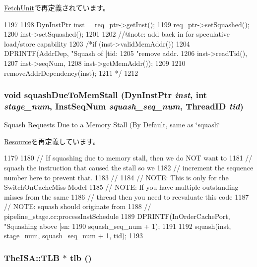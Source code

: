 \hyperlink{classFetchUnit_ac2831520eb121be08811b040992f416b}{FetchUnit}で再定義されています。


\begin{DoxyCode}
1197 {
1198     DynInstPtr inst =  req_ptr->getInst();
1199     req_ptr->setSquashed();
1200     inst->setSquashed();
1201 
1202     //@note: add back in for speculative load/store capability
1203     /*if (inst->validMemAddr()) {
1204         DPRINTF(AddrDep, "Squash of [tid:%
1205                 "remove addr. %
1206                 inst->readTid(),
1207                 inst->seqNum,
1208                 inst->getMemAddr());
1209 
1210         removeAddrDependency(inst);
1211     }*/
1212 }
\end{DoxyCode}
\hypertarget{classCacheUnit_ae2d6fba25ece343caad6eb029a4a3b5b}{
\subsubsection[{squashDueToMemStall}]{\setlength{\rightskip}{0pt plus 5cm}void squashDueToMemStall ({\bf DynInstPtr} {\em inst}, \/  int {\em stage\_\-num}, \/  {\bf InstSeqNum} {\em squash\_\-seq\_\-num}, \/  {\bf ThreadID} {\em tid})}}
\label{classCacheUnit_ae2d6fba25ece343caad6eb029a4a3b5b}
Squash Requests Due to a Memory Stall (By Default, same as \char`\"{}squash\char`\"{} 

\hyperlink{classResource_ae2d6fba25ece343caad6eb029a4a3b5b}{Resource}を再定義しています。


\begin{DoxyCode}
1179 {
1180     // If squashing due to memory stall, then we do NOT want to 
1181     // squash the instruction that caused the stall so we
1182     // increment the sequence number here to prevent that.
1183     //
1184     // NOTE: This is only for the SwitchOnCacheMiss Model
1185     // NOTE: If you have multiple outstanding misses from the same
1186     //       thread then you need to reevaluate this code
1187     // NOTE: squash should originate from 
1188     //       pipeline_stage.cc:processInstSchedule
1189     DPRINTF(InOrderCachePort, "Squashing above [sn:%
1190             squash_seq_num + 1);
1191     
1192     squash(inst, stage_num, squash_seq_num + 1, tid);    
1193 }
\end{DoxyCode}
\hypertarget{classCacheUnit_a3cf8b27760278d20d4aa9463f52a2d95}{
\subsubsection[{tlb}]{\setlength{\rightskip}{0pt plus 5cm}TheISA::TLB $\ast$ tlb ()}}
\label{classCacheUnit_a3cf8b27760278d20d4aa9463f52a2d95}




